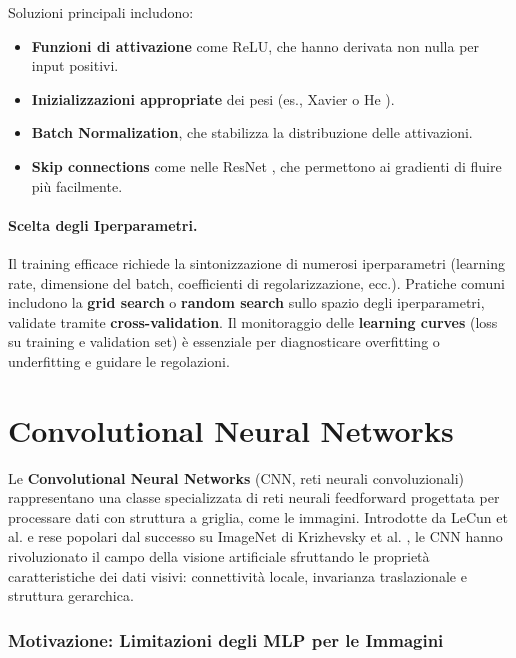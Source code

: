 Soluzioni principali includono:
\begin{itemize}
\item \textbf{Funzioni di attivazione} come ReLU, che hanno derivata non nulla per input positivi.
\item \textbf{Inizializzazioni appropriate} dei pesi (es., Xavier \cite{glorot2010understanding} o He \cite{he2015delving}).
\item \textbf{Batch Normalization}, che stabilizza la distribuzione delle attivazioni.
\item \textbf{Skip connections} come nelle ResNet \cite{he2016deep}, che permettono ai gradienti di fluire più facilmente.
\end{itemize}

\paragraph{Scelta degli Iperparametri.}
Il training efficace richiede la sintonizzazione di numerosi iperparametri (learning rate, dimensione del batch, coefficienti di regolarizzazione, ecc.). Pratiche comuni includono la \textbf{grid search} o \textbf{random search} \cite{bergstra2012random} sullo spazio degli iperparametri, validate tramite \textbf{cross-validation}. Il monitoraggio delle \textbf{learning curves} (loss su training e validation set) è essenziale per diagnosticare overfitting o underfitting e guidare le regolazioni.


\section{Convolutional Neural Networks}
\label{sec:cnn}

Le \textbf{Convolutional Neural Networks} (CNN, reti neurali convoluzionali) rappresentano una classe specializzata di reti neurali feedforward progettata per processare dati con struttura a griglia, come le immagini. Introdotte da LeCun et al. \cite{lecun1998gradient} e rese popolari dal successo su ImageNet di Krizhevsky et al. \cite{krizhevsky2012imagenet}, le CNN hanno rivoluzionato il campo della visione artificiale sfruttando le proprietà caratteristiche dei dati visivi: connettività locale, invarianza traslazionale e struttura gerarchica.

\subsubsection{Motivazione: Limitazioni degli MLP per le Immagini}

